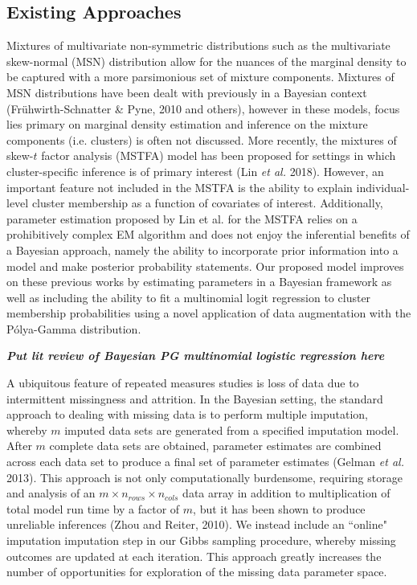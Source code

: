 \documentclass[useAMS,referee]{biom}
\begin{document}
\subsection{Existing Approaches}

Mixtures of multivariate non-symmetric distributions such as the multivariate skew-normal (MSN) distribution allow for the nuances of the marginal density to be captured with a more parsimonious set of mixture components. Mixtures of MSN distributions have been dealt with previously in a Bayesian context (Fr\"{u}hwirth-Schnatter \& Pyne, 2010 and others), however in these models, focus lies primary on marginal density estimation and inference on the mixture components (i.e. clusters) is often not discussed. More recently, the mixtures of skew-$t$ factor analysis (MSTFA) model has been proposed for settings in which cluster-specific inference is of primary interest (Lin \textit{et al.} 2018). However, an important feature not included in the MSTFA is the ability to explain individual-level cluster membership as a function of covariates of interest. Additionally, parameter estimation proposed by Lin et al. for the MSTFA relies on a prohibitively complex EM algorithm and does not enjoy the inferential benefits of a Bayesian approach, namely the ability to incorporate prior information into a model and make posterior probability statements. Our proposed model improves on these previous works by estimating parameters in a Bayesian framework as well as including the ability to fit a multinomial logit regression to cluster membership probabilities using a novel application of data augmentation with the P\'olya-Gamma distribution.

\textbf{\textit{Put lit review of Bayesian PG multinomial logistic regression here}}

A ubiquitous feature of repeated measures studies is loss of data due to intermittent missingness and attrition. In the Bayesian setting, the standard approach to dealing with missing data is to perform multiple imputation, whereby $m$ imputed data sets are generated from a specified imputation model. After $m$ complete data sets are obtained, parameter estimates are combined across each data set to produce a final set of parameter estimates (Gelman \textit{et al.} 2013). This approach is not only computationally burdensome, requiring storage and analysis of an $m \times n_{rows} \times n_{cols}$ data array in addition to multiplication of total model run time by a factor of $m$, but it has been shown to produce unreliable inferences (Zhou and Reiter, 2010). We instead include an ``online" imputation imputation step in our Gibbs sampling procedure, whereby missing outcomes are updated at each iteration. This approach greatly increases the number of opportunities for exploration of the missing data parameter space.
\end{document}
